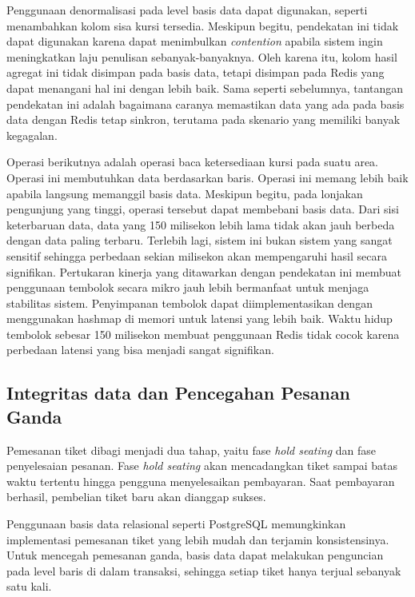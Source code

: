 Penggunaan denormalisasi pada level basis data dapat digunakan, seperti menambahkan kolom sisa kursi tersedia. Meskipun begitu, pendekatan ini tidak dapat digunakan karena dapat menimbulkan \textit{contention} apabila sistem ingin meningkatkan laju penulisan sebanyak-banyaknya. Oleh karena itu, kolom hasil agregat ini tidak disimpan pada basis data, tetapi disimpan pada Redis yang dapat menangani hal ini dengan lebih baik. Sama seperti sebelumnya, tantangan pendekatan ini adalah bagaimana caranya memastikan data yang ada pada basis data dengan Redis tetap sinkron, terutama pada skenario yang memiliki banyak kegagalan.

Operasi berikutnya adalah operasi baca ketersediaan kursi pada suatu area. Operasi ini membutuhkan data berdasarkan baris. Operasi ini memang lebih baik apabila langsung memanggil basis data. Meskipun begitu, pada lonjakan pengunjung yang tinggi, operasi tersebut dapat membebani basis data. Dari sisi keterbaruan data, data yang 150 milisekon lebih lama tidak akan jauh berbeda dengan data paling terbaru. Terlebih lagi, sistem ini bukan sistem yang sangat sensitif sehingga perbedaan sekian milisekon akan mempengaruhi hasil secara signifikan. Pertukaran kinerja yang ditawarkan dengan pendekatan ini membuat penggunaan tembolok secara mikro jauh lebih bermanfaat untuk menjaga stabilitas sistem. Penyimpanan tembolok dapat diimplementasikan dengan menggunakan hashmap di memori untuk latensi yang lebih baik. Waktu hidup tembolok sebesar 150 milisekon membuat penggunaan Redis tidak cocok karena perbedaan latensi yang bisa menjadi sangat signifikan.

\subsection{Integritas data dan Pencegahan Pesanan Ganda}

Pemesanan tiket dibagi menjadi dua tahap, yaitu fase \textit{hold seating} dan fase penyelesaian pesanan. Fase \textit{hold seating} akan mencadangkan tiket sampai batas waktu tertentu hingga pengguna menyelesaikan pembayaran. Saat pembayaran berhasil, pembelian tiket baru akan dianggap sukses.

Penggunaan basis data relasional seperti PostgreSQL memungkinkan implementasi pemesanan tiket yang lebih mudah dan terjamin konsistensinya. Untuk mencegah pemesanan ganda, basis data dapat melakukan penguncian pada level baris di dalam transaksi, sehingga setiap tiket hanya terjual sebanyak satu kali.

